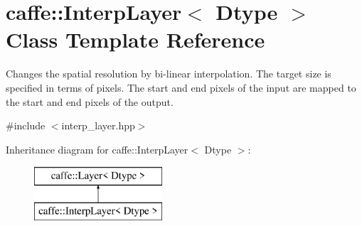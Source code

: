 \hypertarget{classcaffe_1_1InterpLayer}{}\section{caffe\+:\+:Interp\+Layer$<$ Dtype $>$ Class Template Reference}
\label{classcaffe_1_1InterpLayer}


Changes the spatial resolution by bi-\/linear interpolation. The target size is specified in terms of pixels. The start and end pixels of the input are mapped to the start and end pixels of the output.  




{\ttfamily \#include $<$interp\+\_\+layer.\+hpp$>$}

Inheritance diagram for caffe\+:\+:Interp\+Layer$<$ Dtype $>$\+:\begin{figure}[H]
\begin{center}
\leavevmode
\includegraphics[height=2.000000cm]{classcaffe_1_1InterpLayer}
\end{center}
\end{figure}
